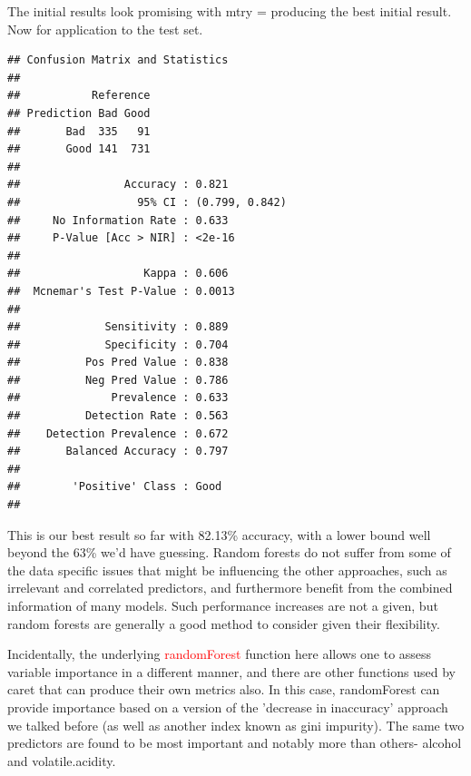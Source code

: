 \documentclass[english,nohyper,titlepage]{tufte-handout}\usepackage{knitr}
\begin{document}
The initial results look promising with mtry =  producing the best initial result.  Now for application to the test set.

\begin{knitrout}\footnotesize
{}\color{fgcolor}\begin{kframe}
\begin{alltt}
 \hlkwb{=} \hlstd{(results_rf, wine_test[,}\hlopt{-}\hlstd{])}
\hlstd{(preds_rf, wine_test[,}\hlstd{],} \hlstd{=}\hlstd{)}
\end{alltt}
\begin{verbatim}
## Confusion Matrix and Statistics
## 
##           Reference
## Prediction Bad Good
##       Bad  335   91
##       Good 141  731
##                                         
##                Accuracy : 0.821         
##                  95% CI : (0.799, 0.842)
##     No Information Rate : 0.633         
##     P-Value [Acc > NIR] : <2e-16        
##                                         
##                   Kappa : 0.606         
##  Mcnemar's Test P-Value : 0.0013        
##                                         
##             Sensitivity : 0.889         
##             Specificity : 0.704         
##          Pos Pred Value : 0.838         
##          Neg Pred Value : 0.786         
##              Prevalence : 0.633         
##          Detection Rate : 0.563         
##    Detection Prevalence : 0.672         
##       Balanced Accuracy : 0.797         
##                                         
##        'Positive' Class : Good          
## 
\end{verbatim}
\end{kframe}
\end{knitrout}


This is our best result so far with 82.13\% accuracy, with a lower bound well beyond the 63\% we'd have guessing.  Random forests do not suffer from some of the data specific issues that might be influencing the other approaches, such as irrelevant and correlated predictors, and furthermore benefit from the combined information of many models.  Such performance increases are not a given, but random forests are generally a good method to consider given their flexibility.

Incidentally, the underlying \textcolor{red}{randomForest} function here allows one to assess variable importance in a different manner, and there are other functions used by caret that can produce their own metrics also.  In this case, randomForest can provide importance based on a version of the 'decrease in inaccuracy' approach we talked before (as well as another index known as gini impurity).  The same two predictors are found to be most important and notably more than others- alcohol and volatile.acidity.
\end{document}
